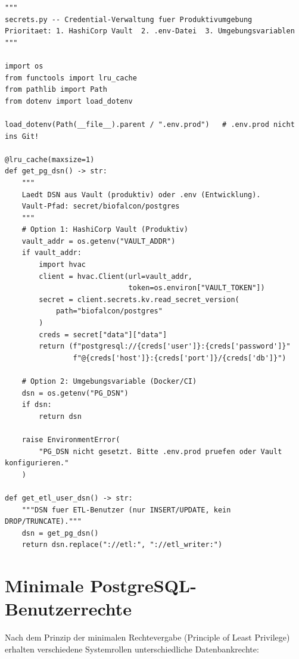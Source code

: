 \documentclass[12pt,a4paper]{report}
\theoremstyle{definition}
\theoremstyle{remark}
\begin{document}
\begin{lstlisting}[style=python, caption={secrets.py: Sichere Credential-Verwaltung via python-dotenv und Vault}]
"""
secrets.py -- Credential-Verwaltung fuer Produktivumgebung
Prioritaet: 1. HashiCorp Vault  2. .env-Datei  3. Umgebungsvariablen
"""

import os
from functools import lru_cache
from pathlib import Path
from dotenv import load_dotenv

load_dotenv(Path(__file__).parent / ".env.prod")   # .env.prod nicht ins Git!

@lru_cache(maxsize=1)
def get_pg_dsn() -> str:
    """
    Laedt DSN aus Vault (produktiv) oder .env (Entwicklung).
    Vault-Pfad: secret/biofalcon/postgres
    """
    # Option 1: HashiCorp Vault (Produktiv)
    vault_addr = os.getenv("VAULT_ADDR")
    if vault_addr:
        import hvac
        client = hvac.Client(url=vault_addr,
                             token=os.environ["VAULT_TOKEN"])
        secret = client.secrets.kv.read_secret_version(
            path="biofalcon/postgres"
        )
        creds = secret["data"]["data"]
        return (f"postgresql://{creds['user']}:{creds['password']}"
                f"@{creds['host']}:{creds['port']}/{creds['db']}")

    # Option 2: Umgebungsvariable (Docker/CI)
    dsn = os.getenv("PG_DSN")
    if dsn:
        return dsn

    raise EnvironmentError(
        "PG_DSN nicht gesetzt. Bitte .env.prod pruefen oder Vault konfigurieren."
    )

def get_etl_user_dsn() -> str:
    """DSN fuer ETL-Benutzer (nur INSERT/UPDATE, kein DROP/TRUNCATE)."""
    dsn = get_pg_dsn()
    return dsn.replace("://etl:", "://etl_writer:")
\end{lstlisting}

\section{Minimale PostgreSQL-Benutzerrechte}

Nach dem Prinzip der minimalen Rechtevergabe (Principle of Least Privilege)
erhalten verschiedene Systemrollen unterschiedliche Datenbankrechte:
\end{document}

